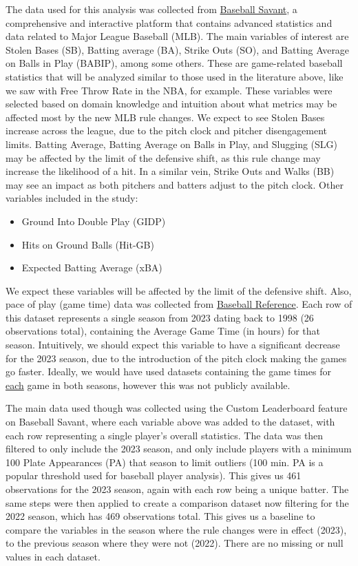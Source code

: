 \documentclass[12pt]{article}
\begin{document}
The data used for this analysis was collected from \href{https://baseballsavant.mlb.com/}{Baseball Savant},
a comprehensive and interactive platform that contains advanced statistics and
data related to Major League Baseball (MLB). The main variables of interest
are Stolen Bases (SB), Batting average (BA), Strike Outs (SO), and Batting
Average on Balls in Play (BABIP), among some others. These are game-related
baseball statistics that will be analyzed similar to those used in the literature
above, like we saw with Free Throw Rate in the NBA, for example. These variables
were selected based on domain knowledge and intuition about what metrics may be
affected most by the new MLB rule changes. We expect to see Stolen Bases increase
across the league, due to the pitch clock and pitcher disengagement limits. Batting
Average, Batting Average on Balls in Play, and Slugging (SLG) may be affected by
the limit of the defensive shift, as this rule change may increase the likelihood
of a hit. In a similar vein, Strike Outs and Walks (BB) may see an impact as both
pitchers and batters adjust to the pitch clock. Other variables included in the
study:

\begin{itemize}
  \item Ground Into Double Play (GIDP)
  \item Hits on Ground Balls (Hit-GB)
  \item Expected Batting Average (xBA)
\end{itemize}

We expect these variables will be affected by the limit of the defensive shift.
Also, pace of play (game time) data was collected from \href{https://www.baseball-reference.com/}{Baseball Reference}.
Each row of this dataset represents a single season from 2023 dating back to 1998
(26 observations total), containing the Average Game Time (in hours) for that season.
Intuitively, we should expect this variable to have a significant decrease for the
2023 season, due to the introduction of the pitch clock making the games go faster.
Ideally, we would have used datasets containing the game times for \underline{each}
game in both seasons, however this was not publicly available.

The main data used though was collected using the Custom Leaderboard feature
on Baseball Savant, where each variable above was added to the dataset, with each
row representing a single player's overall statistics. The data was then filtered
to only include the 2023 season, and only include players with a minimum 100 Plate Appearances (PA)
that season to limit outliers (100 min. PA is a popular threshold used for 
baseball player analysis). This gives us 461 observations for the 2023 season,
again with each row being a unique batter. The same steps were then applied to
create a comparison dataset now filtering for the 2022 season, which has 469
observations total. This gives us a baseline to compare the variables in the
season where the rule changes were in effect (2023), to the previous season where
they were not (2022). There are no missing or null values in each dataset.
\end{document}
